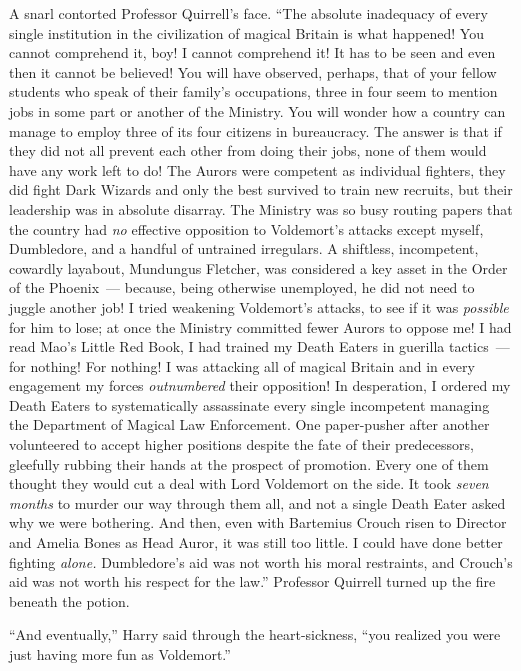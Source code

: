 A snarl contorted Professor Quirrell's face. ``The absolute inadequacy of every single institution in the civilization of magical Britain is what happened! You cannot comprehend it, boy! I cannot comprehend it! It has to be seen and even then it cannot be believed! You will have observed, perhaps, that of your fellow students who speak of their family's occupations, three in four seem to mention jobs in some part or another of the Ministry. You will wonder how a country can manage to employ three of its four citizens in bureaucracy. The answer is that if they did not all prevent each other from doing their jobs, none of them would have any work left to do! The Aurors were competent as individual fighters, they did fight Dark Wizards and only the best survived to train new recruits, but their leadership was in absolute disarray. The Ministry was so busy routing papers that the country had \emph{no} effective opposition to Voldemort's attacks except myself, Dumbledore, and a handful of untrained irregulars. A shiftless, incompetent, cowardly layabout, Mundungus Fletcher, was considered a key asset in the Order of the Phoenix~--- because, being otherwise unemployed, he did not need to juggle another job! I tried weakening Voldemort's attacks, to see if it was \emph{possible} for him to lose; at once the Ministry committed fewer Aurors to oppose me! I had read Mao's Little Red Book, I had trained my Death Eaters in guerilla tactics~--- for nothing! For nothing! I was attacking all of magical Britain and in every engagement my forces \emph{outnumbered} their opposition! In desperation, I ordered my Death Eaters to systematically assassinate every single incompetent managing the Department of Magical Law Enforcement. One paper-pusher after another volunteered to accept higher positions despite the fate of their predecessors, gleefully rubbing their hands at the prospect of promotion. Every one of them thought they would cut a deal with Lord Voldemort on the side. It took \emph{seven months} to murder our way through them all, and not a single Death Eater asked why we were bothering. And then, even with Bartemius Crouch risen to Director and Amelia Bones as Head Auror, it was still too little. I could have done better fighting \emph{alone.} Dumbledore's aid was not worth his moral restraints, and Crouch's aid was not worth his respect for the law.'' Professor Quirrell turned up the fire beneath the potion.

``And eventually,'' Harry said through the heart-sickness, ``you realized you were just having more fun as Voldemort.''

